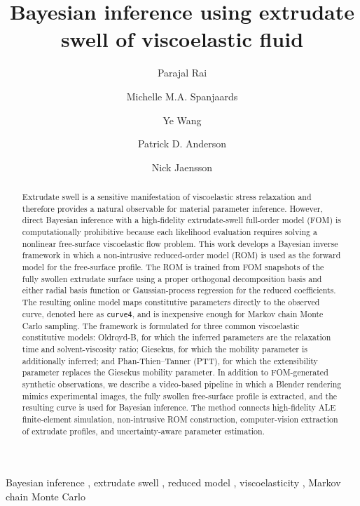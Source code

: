 \documentclass{elsarticle}
\begin{document}
\begin{frontmatter}

\title{Bayesian inference using extrudate swell of viscoelastic fluid}

\author[1]{Parajal Rai}
\author[1]{Michelle M.A. Spanjaards}
\author[1]{Ye Wang}
\author[1]{Patrick D. Anderson}
\author[1]{Nick Jaensson}
\address[1]{Department of Mechanical Engineering,
            Eindhoven University of Technology,
            5600 MB Eindhoven, The Netherlands}


\begin{abstract}

\end{abstract}

\begin{keyword}
Bayesian inference \sep
extrudate swell \sep
reduced model \sep
viscoelasticity \sep
Markov chain Monte Carlo
\end{keyword}

\end{frontmatter}


\begin{abstract}
Extrudate swell is a sensitive manifestation of viscoelastic stress relaxation
and therefore provides a natural observable for material parameter inference.
However, direct Bayesian inference with a high-fidelity extrudate-swell
full-order model (FOM) is computationally prohibitive because each likelihood
evaluation requires solving a nonlinear free-surface viscoelastic flow problem.
This work develops a Bayesian inverse framework in which a non-intrusive
reduced-order model (ROM) is used as the forward model for the free-surface
profile. The ROM is trained from FOM snapshots of the fully swollen extrudate
surface using a proper orthogonal decomposition basis and either radial basis
function or Gaussian-process regression for the reduced coefficients. The
resulting online model maps constitutive parameters directly to the observed
curve, denoted here as \texttt{curve4}, and is inexpensive enough for Markov
chain Monte Carlo sampling. The framework is formulated for three common
viscoelastic constitutive models: Oldroyd-B, for which the inferred parameters
are the relaxation time and solvent-viscosity ratio; Giesekus, for which the
mobility parameter is additionally inferred; and Phan-Thien--Tanner (PTT), for
which the extensibility parameter replaces the Giesekus mobility parameter. In
addition to FOM-generated synthetic observations, we describe a video-based
pipeline in which a Blender rendering mimics experimental images, the fully
swollen free-surface profile is extracted, and the resulting curve is used for
Bayesian inference. The method connects high-fidelity ALE finite-element
simulation, non-intrusive ROM construction, computer-vision extraction of
extrudate profiles, and uncertainty-aware parameter estimation.
\end{abstract}
\end{document}
